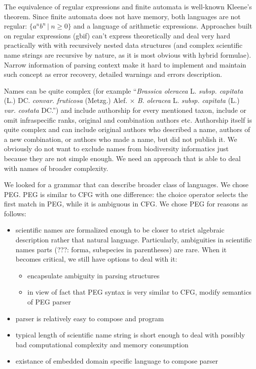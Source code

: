 \documentclass{bmcart}
\begin{document}
The equivalence of regular expressions and finite automata is well-known
Kleene's theorem. Since finite automata does not have memory, both languages
are not regular: $ \{a^nb^n\,\vert\; n\ge 0\} $ and a language of arithmetic
expressions. Approaches built on regular expressions (gbif) can't express
theoretically and deal very hard practically with with recursively nested data
structures (and complex scientific name strings are recursive by nature, as it
is most obvious with hybrid formulae). Narrow information of parsing context
make it hard to implement and maintain such concept as error recovery,
detailed warnings and errors description.

Names can be quite complex (for example ``\textit{Brassica oleracea} L.
\textit{subsp.  capitata} (L.) DC. \textit{convar. fruticosa} (Metzg.) Alef.
$\times$ \textit{B. oleracea} L.  \textit{subsp. capitata} (L.) \textit{var.
costata} DC.'')  and include authorship for every mentioned taxon, include or
omit infraspecific ranks, original and combination authors etc. Authorship
itself is quite complex and can include original authors who described a name,
authors of a new combination, or authors who made a name, but did not publish
it. We obviously do not want to exclude names from biodiversity informatics
just because they are not simple enough. We need an approach that is able to
deal with names of broader complexity.

We looked for a grammar that can describe broader class of languages. We chose
PEG. PEG is similar to CFG with one difference: the choice operator selects
the first match in PEG, while it is ambiguous in CFG. We chose PEG for reasons
as follows:

\begin{itemize}
  \item scientific names are formalized enough to be closer to strict
  algebraic description rather that natural language. Particularly,
  ambiguities in scientific names parts (???: forma, subspecies in
  parentheses) are rare. When it becomes critical, we still have options to
  deal with it:
    \begin{itemize}
      \item encapsulate ambiguity in parsing structures
      \item in view of fact that PEG syntax is very similar to CFG, modify
      semantics of PEG parser
    \end{itemize}
  \item parser is relatively easy to compose and program
  \item typical length of scientific name string is short enough to deal with
  possibly bad computational complexity and memory consumption
  \item existance of embedded domain specific language to compose parser
\end{itemize}
\end{document}
